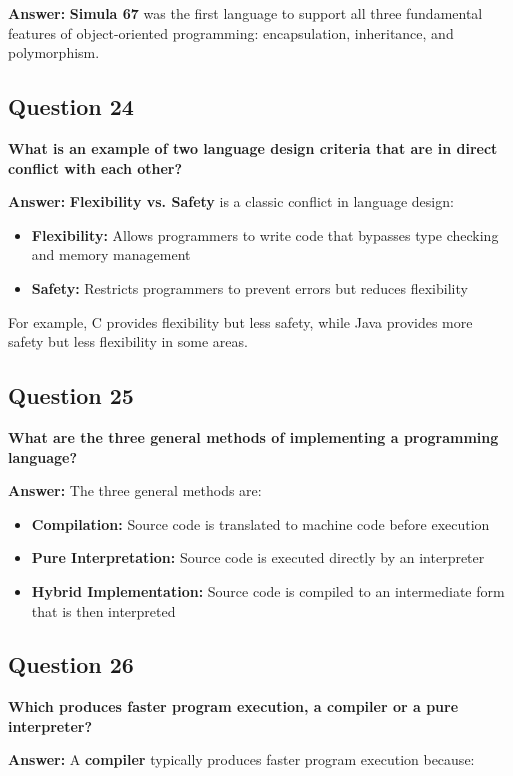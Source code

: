 \documentclass[11pt,a4paper]{article}
\begin{document}
\textbf{Answer:}
\textbf{Simula 67} was the first language to support all three fundamental features of object-oriented programming: encapsulation, inheritance, and polymorphism.

\subsection{Question 24}
\textbf{What is an example of two language design criteria that are in direct conflict with each other?}

\textbf{Answer:}
\textbf{Flexibility vs. Safety} is a classic conflict in language design:

\begin{itemize}
\item \textbf{Flexibility:} Allows programmers to write code that bypasses type checking and memory management
\item \textbf{Safety:} Restricts programmers to prevent errors but reduces flexibility
\end{itemize}

For example, C provides flexibility but less safety, while Java provides more safety but less flexibility in some areas.

\subsection{Question 25}
\textbf{What are the three general methods of implementing a programming language?}

\textbf{Answer:}
The three general methods are:

\begin{itemize}
\item \textbf{Compilation:} Source code is translated to machine code before execution
\item \textbf{Pure Interpretation:} Source code is executed directly by an interpreter
\item \textbf{Hybrid Implementation:} Source code is compiled to an intermediate form that is then interpreted
\end{itemize}

\subsection{Question 26}
\textbf{Which produces faster program execution, a compiler or a pure interpreter?}

\textbf{Answer:}
A \textbf{compiler} typically produces faster program execution because:
\end{document}
